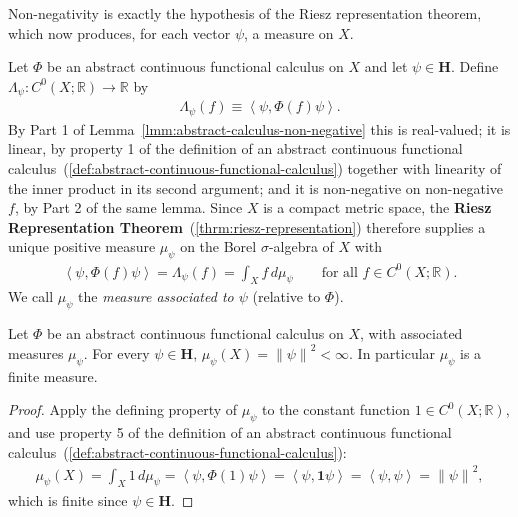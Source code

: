 Non-negativity is exactly the hypothesis of the Riesz representation theorem, which now produces, for each vector $\psi$, a measure on $X$.

\begin{definition}
    \label{def:abstract-associated-measures}
    \leanok
    Let $\Phi$ be an abstract continuous functional calculus on $X$ and let $\psi \in \mathbf{H}$. Define $\Lambda_\psi : C^0(X;\mathbb{R}) \to \mathbb{R}$ by
    \begin{align}
        \Lambda_\psi(f) \equiv \left< \psi, \Phi(f)\psi \right>.
    \end{align}
    By Part 1 of Lemma~\ref{lmm:abstract-calculus-non-negative} this is real-valued; it is linear, by property 1 of the definition of an abstract continuous functional calculus~(\ref{def:abstract-continuous-functional-calculus}) together with linearity of the inner product in its second argument; and it is non-negative on non-negative $f$, by Part 2 of the same lemma. Since $X$ is a compact metric space, the \textbf{Riesz Representation Theorem}~(\ref{thrm:riesz-representation}) therefore supplies a unique positive measure $\mu_\psi$ on the Borel $\sigma$-algebra of $X$ with
    \begin{align}
        \left< \psi, \Phi(f)\psi \right> = \Lambda_\psi(f) = \int_X f \, d\mu_\psi \qquad \text{for all } f \in C^0(X;\mathbb{R}).
    \end{align}
    We call $\mu_\psi$ the \textit{measure associated to $\psi$} (relative to $\Phi$).
\end{definition}

\begin{lemma}
    \label{lmm:abstract-associated-measures-finite}
    \leanok
    Let $\Phi$ be an abstract continuous functional calculus on $X$, with associated measures $\mu_\psi$. For every $\psi \in \mathbf{H}$, $\mu_\psi(X) = \left\| \psi \right\|^2 < \infty$. In particular $\mu_\psi$ is a finite measure.
\end{lemma}
\begin{proof}
    \leanok
Apply the defining property of $\mu_\psi$ to the constant function $1 \in C^0(X;\mathbb{R})$, and use property 5 of the definition of an abstract continuous functional calculus~(\ref{def:abstract-continuous-functional-calculus}):
\begin{align}
    \mu_\psi(X) = \int_X 1 \, d\mu_\psi = \left< \psi, \Phi(1)\psi \right> = \left< \psi, \mathbf{1}\psi \right> = \left< \psi,\psi \right> = \left\| \psi \right\|^2,
\end{align}
which is finite since $\psi \in \mathbf{H}$.
\end{proof}


